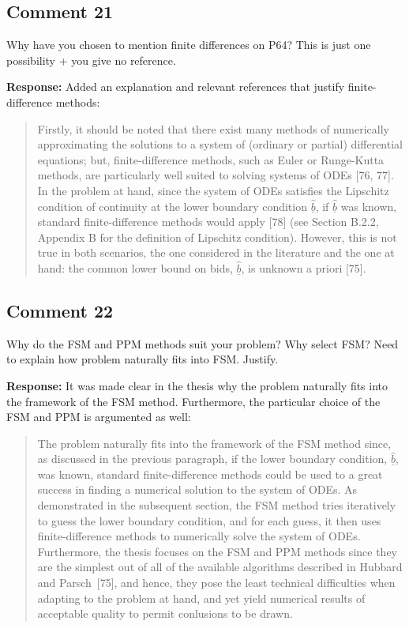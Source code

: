 \documentclass[10pt,a4paper,notitlepage]{article}
\numberwithin{equation}{section}
\begin{document}
\subsection{Comment 21}
Why have you chosen to mention finite differences on P64? This is just one possibility + you give no reference. 

\textbf{Response:}
Added an explanation and relevant references that justify finite-difference methods:
\begin{quote}
Firstly, it should be noted that there exist many methods of numerically approximating the solutions to a system of (ordinary or partial) differential equations; but, finite-difference methods, such as Euler or Runge-Kutta methods, are particularly well suited to solving systems of ODEs [76, 77]. In the problem at hand, since the system of ODEs satisfies the Lipschitz condition of continuity at the lower boundary condition $\underline{\hat{b}}$, if $\underline{\hat{b}}$ was known, standard finite-difference methods would apply [78] (see Section B.2.2, Appendix B for the definition of Lipschitz condition). However, this is not true in both scenarios, the one considered in the literature and the one at hand: the common lower bound on bids, $\underline{\hat{b}}$, is unknown a priori [75].
\end{quote}

\subsection{Comment 22}
Why do the FSM and PPM methods suit your problem? Why select FSM? Need to explain how problem naturally fits into FSM. Justify.

\textbf{Response:}
It was made clear in the thesis why the problem naturally fits into the framework of the FSM method. Furthermore, the particular choice of the FSM and PPM is argumented as well:
\begin{quote}
  The problem naturally fits into the framework of the FSM method since, as discussed in the previous paragraph, if the lower boundary condition, $\underline{\hat{b}}$, was known, standard finite-difference methods could be used to a great success in finding a numerical solution to the system of ODEs. As demonstrated in the subsequent section, the FSM method tries iteratively to guess the lower boundary condition, and for each guess, it then uses finite-difference methods to numerically solve the system of ODEs. Furthermore, the thesis focuses on the FSM and PPM methods since they are the simplest out of all of the available algorithms described in Hubbard and Parsch~[75], and hence, they pose the least technical difficulties when adapting to the problem at hand, and yet yield numerical results of acceptable quality to permit conlusions to be drawn.
\end{quote}
\end{document}
